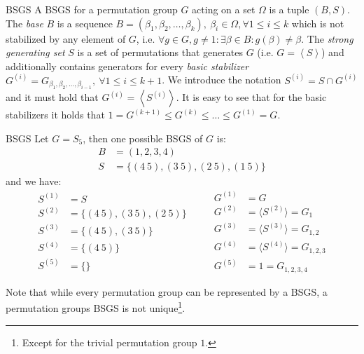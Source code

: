 \begin{defn}[label=defn:bsgs]{BSGS}{}
  A BSGS for a permutation group $G$ acting on a set $\Omega$ is a tuple $(B,
  S)$. The \textit{base} $B$ is a sequence $B = (\beta_1, \beta_2, \dots,
  \beta_k),\ \beta_i \in \Omega, \forall 1 \leq i \leq k$ which is not stabilized
  by any element of $G$, i.e.  $\forall g \in G, g \ne 1: \exists \beta \in B:
  g(\beta) \ne \beta$. The \textit{strong generating set} $S$ is a set of
  permutations that generates $G$ (i.e. $G = \left<S\right>$) and additionally
  contains generators for every \textit{basic stabilizer} $G^{(i)} = G_{\beta_1,
  \beta_2, \dots, \beta_{i-1}},\ \forall 1 \leq i \leq k + 1$. We introduce the
  notation $S^{(i)} = S \cap G^{(i)}$ and it must hold that $G^{(i)} =
  \left<S^{(i)}\right>$. It is easy to see that for the basic stabilizers it
  holds that $1 = G^{(k+1)} \leq G^{(k)} \leq \dots \leq G^{(1)} = G$.
\end{defn}

\begin{exmp}{BSGS}
  Let $G = S_5$, then one possible BSGS of $G$ is:
  \begin{align*}
  B &= (1, 2, 3, 4) \\
  S &= \{(4\ 5), (3\ 5), (2\ 5), (1\ 5)\}
  \end{align*}
  and we have:
  \begin{equation*}
    \begin{split}
      S^{(1)} &= S \\
      S^{(2)} &= \{(4\ 5), (3\ 5), (2\ 5)\} \\
      S^{(3)} &= \{(4\ 5), (3\ 5)\} \\
      S^{(4)} &= \{(4\ 5)\} \\
      S^{(5)} &= \{\}
    \end{split}
    \qquad
    \begin{split}
      G^{(1)} &= G \\
      G^{(2)} &= \langle S^{(2)} \rangle = G_{1}\\
      G^{(3)} &= \langle S^{(3)} \rangle = G_{1,2}\\
      G^{(4)} &= \langle S^{(4)} \rangle = G_{1,2,3}\\
      G^{(5)} &= 1 = G_{1,2,3,4}
    \end{split}
  \end{equation*}
\end{exmp}
%
Note that while every permutation group can be represented by a BSGS, a
permutation groups BSGS is not unique\footnote{Except for the trivial
permutation group $1$.}.


